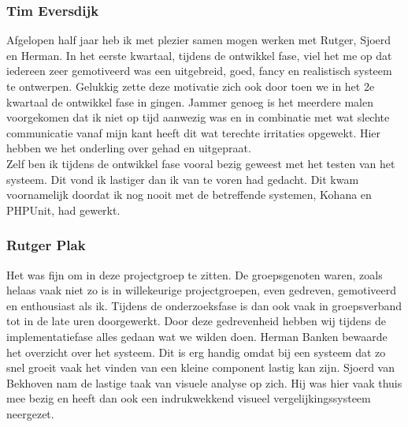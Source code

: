 \documentclass[a4paper,10pt]{article}
\begin{document}
		\subsubsection{Tim Eversdijk}
		Afgelopen half jaar heb ik met plezier samen mogen werken met Rutger, Sjoerd en Herman. In het eerste kwartaal, tijdens de ontwikkel fase, viel het me op dat iedereen zeer gemotiveerd was een uitgebreid, goed, fancy en realistisch systeem te ontwerpen. Gelukkig zette deze motivatie zich ook door toen we in het 2e kwartaal de ontwikkel fase in gingen. Jammer genoeg is het meerdere malen voorgekomen dat ik niet op tijd aanwezig was en in combinatie met wat slechte communicatie vanaf mijn kant heeft dit wat terechte irritaties opgewekt. Hier hebben we het onderling over gehad en uitgepraat.\\
		Zelf ben ik tijdens de ontwikkel fase vooral bezig geweest met het testen van het systeem. Dit vond ik lastiger dan ik van te voren had gedacht. Dit kwam voornamelijk doordat ik nog nooit met de betreffende systemen, Kohana en PHPUnit, had gewerkt.
		
		\subsubsection{Rutger Plak}
		Het was fijn om in deze projectgroep te zitten. De groepsgenoten waren, zoals helaas vaak niet zo is in willekeurige projectgroepen, even gedreven, gemotiveerd en enthousiast als ik. Tijdens de onderzoeksfase is dan ook vaak in groepsverband tot in de late uren doorgewerkt. Door deze gedrevenheid hebben wij tijdens de implementatiefase alles gedaan wat we wilden doen. Herman Banken bewaarde het overzicht over het systeem. Dit is erg handig omdat bij een systeem dat zo snel groeit vaak het vinden van een kleine component lastig kan zijn. Sjoerd van Bekhoven nam de lastige taak van visuele analyse op zich. Hij was hier vaak thuis mee bezig en heeft dan ook een indrukwekkend visueel vergelijkingssysteem neergezet.
		
\end{document}
